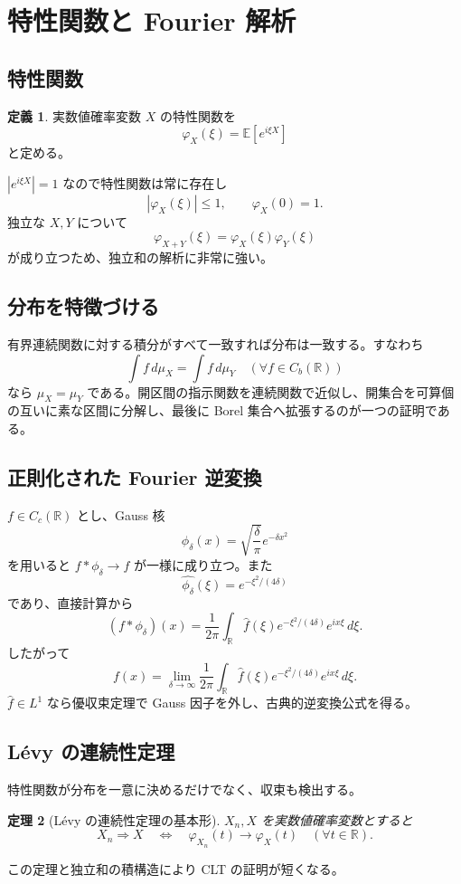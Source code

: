 \documentclass[a4paper,11pt,pdflatex,ja=standard,jafont=ipaex-type1,
  magstyle=real,scale=1]{bxjsarticle}
\newtheorem{theorem}{定理}[section]
\theoremstyle{definition}
\newtheorem{definition}[theorem]{定義}
\theoremstyle{remark}
\newcommand{\E}{\mathbb E}
\newcommand{\R}{\mathbb R}
\newcommand{\1}{\mathbf 1}
\begin{document}
\section{特性関数と Fourier 解析}
\subsection{特性関数}
\begin{definition}
実数値確率変数 $X$ の特性関数を
\[
\varphi_X(\xi)=\E[e^{i\xi X}]
\]
と定める。
\end{definition}
$|e^{i\xi X}|=1$ なので特性関数は常に存在し
\[
|\varphi_X(\xi)|\le1,
\qquad \varphi_X(0)=1.
\]
独立な $X,Y$ について
\[
\varphi_{X+Y}(\xi)=\varphi_X(\xi)\varphi_Y(\xi)
\]
が成り立つため、独立和の解析に非常に強い。

\subsection{分布を特徴づける}
有界連続関数に対する積分がすべて一致すれば分布は一致する。すなわち
\[
\int f\,d\mu_X=\int f\,d\mu_Y\quad(\forall f\in C_b(\R))
\]
なら $\mu_X=\mu_Y$ である。開区間の指示関数を連続関数で近似し、開集合を可算個の互いに素な区間に分解し、最後に Borel 集合へ拡張するのが一つの証明である。

\subsection{正則化された Fourier 逆変換}
$f\in C_c(\R)$ とし、Gauss 核
\[
\phi_\delta(x)=\sqrt{\frac\delta\pi}e^{-\delta x^2}
\]
を用いると $f*\phi_\delta\to f$ が一様に成り立つ。また
\[
\widehat{\phi_\delta}(\xi)=e^{-\xi^2/(4\delta)}
\]
であり、直接計算から
\[
(f*\phi_\delta)(x)
=\frac1{2\pi}\int_{\R}\hat f(\xi)e^{-\xi^2/(4\delta)}e^{ix\xi}\,d\xi.
\]
したがって
\[
f(x)=\lim_{\delta\to\infty}
\frac1{2\pi}\int_{\R}\hat f(\xi)e^{-\xi^2/(4\delta)}e^{ix\xi}\,d\xi.
\]
$\hat f\in L^1$ なら優収束定理で Gauss 因子を外し、古典的逆変換公式を得る。

\subsection{L\'evy の連続性定理}
特性関数が分布を一意に決めるだけでなく、収束も検出する。
\begin{theorem}[L\'evy の連続性定理の基本形]
$X_n,X$ を実数値確率変数とすると
\[
X_n\Rightarrow X
\quad\Longleftrightarrow\quad
\varphi_{X_n}(t)\to\varphi_X(t)\quad(\forall t\in\R).
\]
\end{theorem}
この定理と独立和の積構造により CLT の証明が短くなる。
\end{document}
